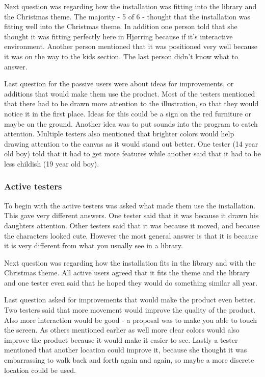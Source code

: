 Next question was regarding how the installation was fitting into the library and the Christmas theme. The majority - 5 of 6 - thought that the installation was fitting well into the Christmas theme. In addition one person told that she thought it was fitting perfectly here in Hj{\o}rring because if it's interactive environment. Another person mentioned that it was positioned very well because it was on the way to the kids section.
The last person didn't know what to answer.

Last question for the passive users were about ideas for improvements, or additions that would make them use the product.
Most of the testers mentioned that there had to be drawn more attention to the illustration, so that they would notice it in the first place. Ideas for this could be a sign on the red furniture or maybe on the ground. Another idea was to put sounds into the program to catch attention. Multiple testers also mentioned that brighter colors would help drawing attention to the canvas as it would stand out better.
One tester (14 year old boy) told that it had to get more features while another said that it had to be less childish (19 year old boy).

\subsubsection{Active testers}
To begin with the active testers was asked what made them use the installation. This gave very different answers. One tester said that it was because it drawn his daughters attention. Other testers said that it was because it moved, and because the characters looked cute. However the most general answer is that it is because it is very different from what you usually see in a library.

Next question was regarding how the installation fits in the library and with the Christmas theme. All active users agreed that it fits the theme and the library and one tester even said that he hoped they would do something similar all year.

Last question asked for improvements that would make the product even better. Two testers said that more movement would improve the quality of the product. Also more interaction would be good - a proposal was to make you able to touch the screen.
As others mentioned earlier as well more clear colors would also improve the product because it would make it easier to see. Lastly a tester mentioned that another location could improve it, because she thought it was embarrassing to walk back and forth again and again, so maybe a more discrete location could be used.


